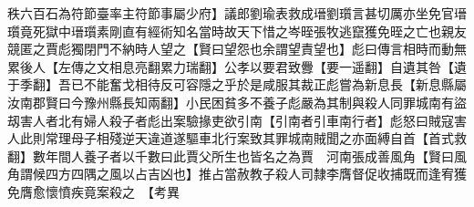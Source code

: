 秩六百石為符節臺率主符節事屬少府】議郎劉瑜表救成瑨劉瓆言甚切厲亦坐免官瑨瓆竟死獄中瑨瓆素剛直有經術知名當時故天下惜之岑晊張牧逃竄獲免晊之亡也親友競匿之賈彪獨閉門不納時人望之【賢曰望怨也余謂望責望也】彪曰傳言相時而動無累後人【左傳之文相息亮翻累力瑞翻】公孝以要君致釁【要一遥翻】自遺其咎【遺于季翻】吾已不能奮戈相待反可容隱之乎於是咸服其裁正彪嘗為新息長【新息縣屬汝南郡賢曰今豫州縣長知兩翻】小民困貧多不養子彪嚴為其制與殺人同罪城南有盜刼害人者北有婦人殺子者彪出案驗掾吏欲引南【引南者引車南行者】彪怒曰賊寇害人此則常理母子相殘逆天違道遂驅車北行案致其罪城南賊聞之亦面縛自首【首式救翻】數年間人養子者以千數曰此賈父所生也皆名之為賈　河南張成善風角【賢曰風角謂候四方四隅之風以占吉凶也】推占當赦教子殺人司隸李膺督促收捕既而逢宥獲免膺愈懷憤疾竟案殺之　【考異